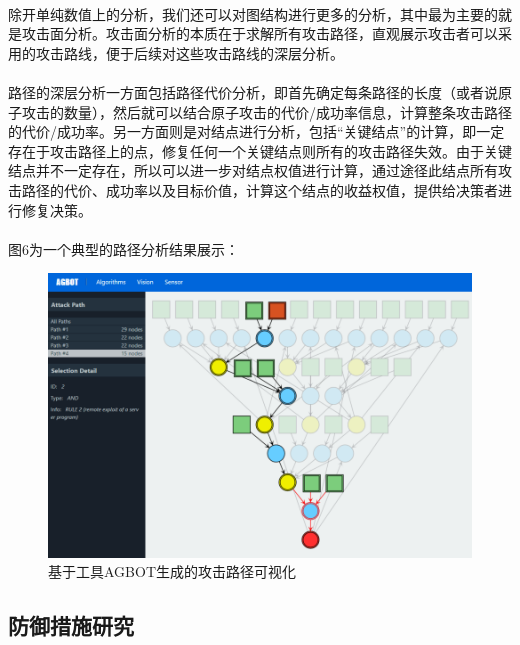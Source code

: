 \documentclass[12pt,a4paper]{article}
\begin{document}
\paragraph{}
除开单纯数值上的分析，我们还可以对图结构进行更多的分析，其中最为主要的就是攻击面分析。攻击面分析的本质在于求解所有攻击路径，直观展示攻击者可以采用的攻击路线，便于后续对这些攻击路线的深层分析。

\paragraph{}
路径的深层分析一方面包括路径代价分析，即首先确定每条路径的长度（或者说原子攻击的数量），然后就可以结合原子攻击的代价/成功率信息，计算整条攻击路径的代价/成功率。另一方面则是对结点进行分析，包括“关键结点”的计算，即一定存在于攻击路径上的点，修复任何一个关键结点则所有的攻击路径失效。由于关键结点并不一定存在，所以可以进一步对结点权值进行计算，通过途径此结点所有攻击路径的代价、成功率以及目标价值，计算这个结点的收益权值，提供给决策者进行修复决策。

\paragraph{}
图6为一个典型的路径分析结果展示：
\begin{figure}[!htp]
	\centering
	\includegraphics[scale=0.40]{images/paths.png} 
	\caption{基于工具AGBOT生成的攻击路径可视化}
\end{figure}


\subsection{防御措施研究}
\end{document}
